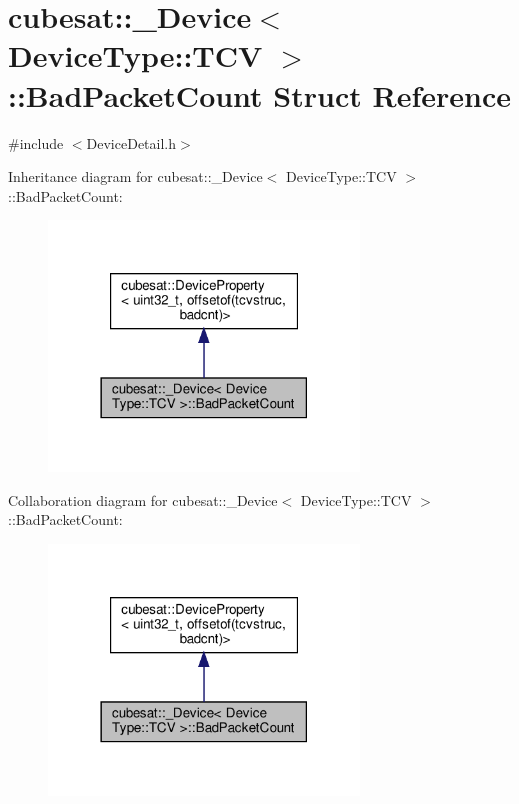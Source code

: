 \hypertarget{structcubesat_1_1__Device_3_01DeviceType_1_1TCV_01_4_1_1BadPacketCount}{}\section{cubesat\+:\+:\+\_\+\+Device$<$ Device\+Type\+:\+:T\+CV $>$\+:\+:Bad\+Packet\+Count Struct Reference}
\label{structcubesat_1_1__Device_3_01DeviceType_1_1TCV_01_4_1_1BadPacketCount}


{\ttfamily \#include $<$Device\+Detail.\+h$>$}



Inheritance diagram for cubesat\+:\+:\+\_\+\+Device$<$ Device\+Type\+:\+:T\+CV $>$\+:\+:Bad\+Packet\+Count\+:\nopagebreak
\begin{figure}[H]
\begin{center}
\leavevmode
\includegraphics[width=234pt]{structcubesat_1_1__Device_3_01DeviceType_1_1TCV_01_4_1_1BadPacketCount__inherit__graph}
\end{center}
\end{figure}


Collaboration diagram for cubesat\+:\+:\+\_\+\+Device$<$ Device\+Type\+:\+:T\+CV $>$\+:\+:Bad\+Packet\+Count\+:\nopagebreak
\begin{figure}[H]
\begin{center}
\leavevmode
\includegraphics[width=234pt]{structcubesat_1_1__Device_3_01DeviceType_1_1TCV_01_4_1_1BadPacketCount__coll__graph}
\end{center}
\end{figure}
